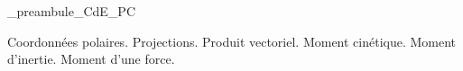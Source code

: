 



\ifdefined\mainIsLoaded\else
\RequirePackage{import}
{_preambule_CdE_PC}

\fi







\debutFicheEntrainement                                                  %




\begin{prerequis}
	Coordonnées polaires. Projections. Produit vectoriel. Moment cinétique. Moment d'inertie. Moment d'une force.
\end{prerequis}




